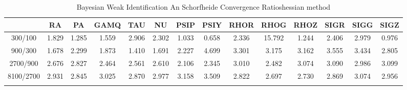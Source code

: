 \documentclass[a4paper,10pt]{article}
\begin{document}
\centering
\begin{longtable}{cccccccccccccc}
\toprule
 & RA & PA & GAMQ & TAU & NU & PSIP & PSIY & RHOR & RHOG & RHOZ & SIGR & SIGG & SIGZ \\
\midrule
300/100 & 1.829 & 1.285 & 1.559 & 2.906 & 2.302 & 1.033 & 0.658 & 2.336 & 15.792 & 1.244 & 2.406 & 2.979 & 0.976 \\
900/300 & 1.678 & 2.299 & 1.873 & 1.410 & 1.691 & 2.227 & 4.699 & 3.301 & 3.175 & 3.162 & 3.555 & 3.434 & 2.805 \\
2700/900 & 2.676 & 2.827 & 2.464 & 2.561 & 2.610 & 2.106 & 2.345 & 3.010 & 2.482 & 3.074 & 3.090 & 2.986 & 3.099 \\
8100/2700 & 2.931 & 2.845 & 3.025 & 2.870 & 2.977 & 3.158 & 3.509 & 2.822 & 2.697 & 2.730 & 2.869 & 3.074 & 2.956 \\
\bottomrule
\caption{Bayesian Weak Identification An Schorfheide Convergence Ratioshessian method}
\label{table:tbl:WeakAnSchoConvergenceRatios_hessian}
\end{longtable}
\end{document}
